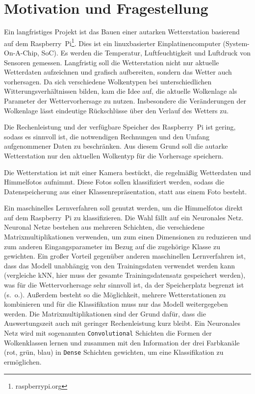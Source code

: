 \newpage
{}

\hypertarget{einleitung-motivation-fragestellung}{%
\section{Motivation und Fragestellung}\label{einleitung-motivation-fragestellung}}

Ein langfristiges Projekt ist das Bauen einer autarken Wetterstation
basierend auf dem Raspberry~Pi\footnote{raspberrypi.org}. Dies ist ein
linuxbasierter Einplatinencomputer (System-On-A-Chip, SoC). Es werden
die Temperatur, Luftfeuchtigkeit und Luftdruck von Sensoren gemessen.
Langfristig soll die Wetterstation nicht nur aktuelle Wetterdaten
aufzeichnen und grafisch aufbereiten, sondern das Wetter auch
vorhersagen. Da sich verschiedene Wolkentypen bei unterschiedlichen
Witterungsverhältnissen bilden, kam die Idee auf, die aktuelle
Wolkenlage als Parameter der Wettervorhersage zu nutzen. Insbesondere
die Veränderungen der Wolkenlage lässt eindeutige Rückschlüsse über den
Verlauf des Wetters zu.

Die Rechenleistung und der verfügbare Speicher des Raspberry~Pi ist
gering, sodass es sinnvoll ist, die notwendigen Rechnungen und den
Umfang aufgenommener Daten zu beschränken. Aus diesem Grund soll die
autarke Wetterstation nur den aktuellen Wolkentyp für die Vorhersage
speichern.

Die Wetterstation ist mit einer Kamera bestückt, die regelmäßig
Wetterdaten und Himmelfotos aufnimmt. Diese Fotos sollen klassifiziert
werden, sodass die Datenspeicherung aus einer Klassenrepräsentation,
statt aus einem Foto besteht.

Ein maschinelles Lernverfahren soll genutzt werden, um die Himmelfotos
direkt auf dem Raspberry~Pi zu klassifizieren. Die Wahl fällt auf ein
Neuronales Netz. Neuronal Netze bestehen aus mehreren Schichten, die
verschiedene Matrixmultiplikationen verwenden, um zum einen Dimensionen
zu reduzieren und zum anderen Eingangsparameter im Bezug auf die zugehörige Klasse
zu gewichten. Ein großer Vorteil gegenüber anderen maschinellen
Lernverfahren ist, dass das Modell unabhängig von den Trainingsdaten
verwendet werden kann (vergleiche kNN, hier muss der gesamte
Trainingsdatensatz gespeichert werden), was für die Wettervorhersage
sehr sinnvoll ist, da der Speicherplatz begrenzt ist (s.~o.). Außerdem
besteht so die Möglichkeit, mehrere Wetterstationen zu kombinieren und
für die Klassifikation muss nur das Modell weitergegeben werden. Die
Matrixmultiplikationen sind der Grund dafür, dass die Auswertungszeit
auch mit geringer Rechenleistung kurz bleibt. Ein Neuronales Netz wird
mit sogenannten \texttt{Convolutional} Schichten die Formen der
Wolkenklassen lernen und zusammen mit den Information der drei
Farbkanäle (rot, grün, blau) in \texttt{Dense} Schichten gewichten, um
eine Klassifikation zu ermöglichen.

